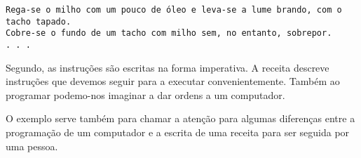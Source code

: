 \begin{lstlisting}
Rega-se o milho com um pouco de óleo e leva-se a lume brando, com o tacho tapado. 
Cobre-se o fundo de um tacho com milho sem, no entanto, sobrepor. 
. . . 
\end{lstlisting}


Segundo, as instruções são escritas na forma imperativa. A receita descreve instruções que devemos seguir para a executar convenientemente. Também ao programar podemo-nos imaginar a dar ordens a um computador.

O exemplo serve também para chamar a atenção para algumas diferenças entre a programação de um computador e a escrita de uma receita para ser seguida por uma pessoa.

%
%
%
%
%

